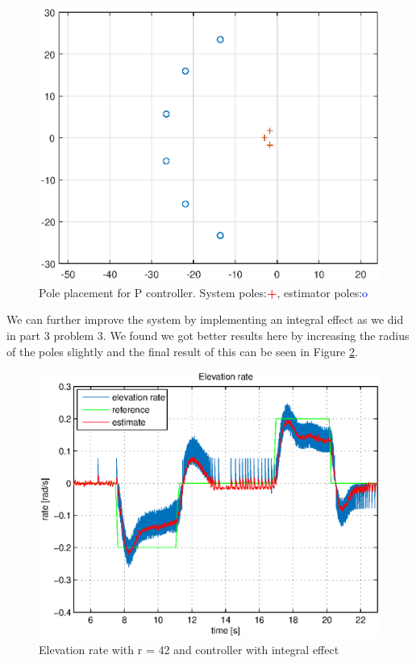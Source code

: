 \begin{figure}[H]
    \centering
	\includegraphics[width=0.9\linewidth]{plots/part4new/P/poles.eps}
    \caption{Pole placement for P controller. System poles:\textbf{\textcolor{red}{+}}, estimator poles:\textcolor{blue}{o}}

    \label{fig:pole_placement}
\end{figure}

We can further improve the system by implementing an integral effect as we did in part 3 problem 3. We found we got better results here by increasing the radius of the poles slightly and the final result of this can be seen in Figure \ref{fig:e_rate_42}.\\\medskip

\begin{figure}[H]
    \centering
	\includegraphics[width=0.9\linewidth]{plots/part4new/PI/e_rate_42.eps}
    \caption{Elevation rate with r = 42 and controller with integral effect}

    \label{fig:e_rate_42}
\end{figure}

